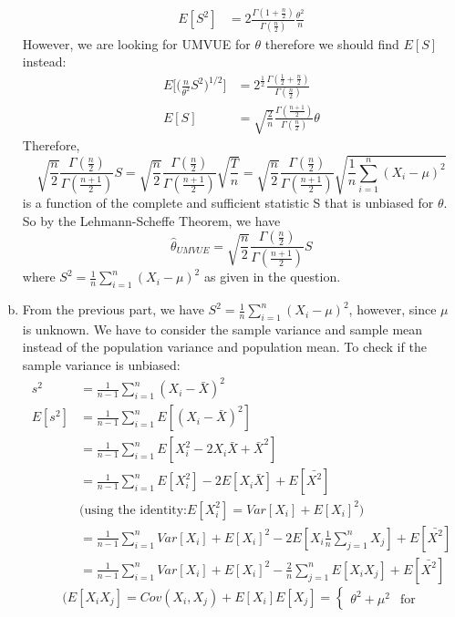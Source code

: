 \documentclass[a4paper,11pt]{article}
\begin{document}
\begin{enumerate}[(a)]
\begin{align*}
			E[S^2] & =  2 \frac{\Gamma(1+\frac{n}{2})}{\Gamma(\frac{n}{2})} \frac{\theta^2}{n}
			\end{align*}
			However, we are looking for UMVUE for $\theta$ therefore we should find $E[S]$ instead:
			\begin{align*}
			E\bigg[\bigg(\frac{n}{\theta^2}S^2\bigg)^{1/2}\bigg]&=  2^{\frac{1}{2}} \frac{\Gamma(\frac{1}{2}+\frac{n}{2})}{\Gamma(\frac{n}{2})}\\
			E[S] & =  \sqrt{\frac{2}{n}} \frac{\Gamma(\frac{n+1}{2})}{\Gamma(\frac{n}{2})} \theta
			\end{align*}
			Therefore,
			\[
			 \sqrt{\frac{n}{2}} \frac{\Gamma(\frac{n}{2})}{\Gamma(\frac{n+1}{2})}S = \sqrt{\frac{n}{2}} \frac{\Gamma(\frac{n}{2})}{\Gamma(\frac{n+1}{2})} \sqrt{\frac{T}{n}}=  \sqrt{\frac{n}{2}} \frac{\Gamma(\frac{n}{2})}{\Gamma(\frac{n+1}{2})} \sqrt{\frac{1}{n}\sum^n_{i=1} (X_i-\mu)^2}
			\]
			is a function of the complete and sufficient statistic S that is unbiased for $\theta$. So by the Lehmann-Scheffe Theorem, we have
			\[
			\hat{\theta}_{UMVUE} = \sqrt{\frac{n}{2}} \frac{\Gamma(\frac{n}{2})}{\Gamma(\frac{n+1}{2})}S
			\]
			where $S^2 = \frac{1}{n}\sum^n_{i=1} (X_i-\mu)^2$ as given in the question.
		\newpage
		\item
			From the previous part, we have $S^2 = \frac{1}{n}\sum^n_{i=1} (X_i-\mu)^2$, however, since $\mu$ is unknown. We have to consider the sample variance and sample mean instead of the population variance and population mean. To check if the sample variance is unbiased:
			\begin{align*}
			s^2 &=  \frac{1}{n-1}\sum^n_{i=1} (X_i-\bar{X})^2 \\
			E[s^2] & =  \frac{1}{n-1}\sum^n_{i=1} E[(X_i-\bar{X})^2] \\
			& =  \frac{1}{n-1}\sum^n_{i=1} E[X_i^2-2X_i\bar{X}+\bar{X}^2] \\
			&= \frac{1}{n-1}\sum^n_{i=1} E[X_i^2]-2E[X_i\bar{X}]+E[\bar{X^2}] \\
			&\bigg( \mbox{using the identity:}E[X_i^2]=Var[X_i]+E[X_i]^2\bigg)\\
			&= \frac{1}{n-1}\sum^n_{i=1} Var[X_i]+E[X_i]^2 - 2E[X_i\frac{1}{n}\sum^n_{j=1}X_j]+E[\bar{X^2}] \\
			&=  \frac{1}{n-1}\sum^n_{i=1} Var[X_i]+E[X_i]^2 - \frac{2}{n}\sum^n_{j=1}E[X_iX_j]+E[\bar{X^2}]
			\end{align*}
		\[
		 \bigg( E[X_iX_j] = Cov(X_i,X_j)+E[X_i]E[X_j] = 
		\left\{
			\begin{array}{rcl}
			\theta^2 + \mu^2 & \mbox{for}

\end{array}\]
\end{enumerate}
\end{document}
